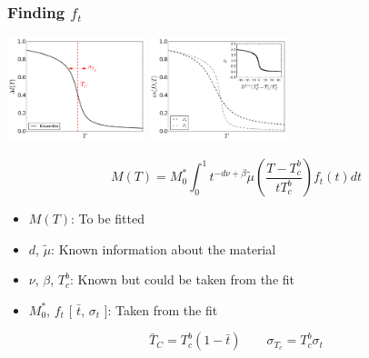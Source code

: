 \documentclass{beamer}
\begin{document}
\begin{frame}
	\frametitle{Finding $f_t$}

	\begin{center}
	\includegraphics[width=4cm]{Images/Aggregate} \hspace{3mm}
	\includegraphics[width=4cm]{Images/Ds}

	$$
	M(T) = M_0^*\int_0^1 t^{-d\nu +\beta} \tilde{\mu}\left(\frac{T-T_c^b}{tT_c^b}\right) f_t(t) dt
	$$

	\begin{itemize}
		\item{$M(T)$: To be fitted}
		\item{$d$, $\tilde{\mu}$: Known information about the material}
		\item{$\nu$, $\beta$, $T_c^b$: Known but could be taken from the fit}
		\item{$M_0^*$, $f_t$ [ $\bar{t}$, $\sigma_t$ ]: Taken from the fit}
	\end{itemize}

	$$
	\bar{T}_C = T_c^b(1 - \bar{t}) \quad \quad \sigma_{T_c} = T_c^b\sigma_t
	$$

	\end{center}
\end{frame}
\end{document}
